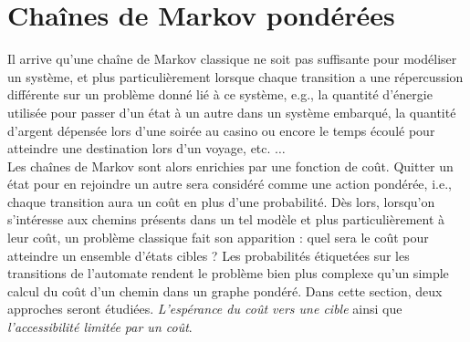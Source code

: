 \documentclass[12pt,a4paper]{report}
\theoremstyle{definition}%
\theoremstyle{remark}
\newtheorem{example}{Exemple}[chapter]
\newcommand{\eg}{e.g., }
\newcommand{\ie}{i.e., }
\let\labelitemi\labelitemii
\begin{document}
%

\section{Chaînes de Markov pondérées}
Il arrive qu'une chaîne de Markov classique ne soit pas suffisante pour modéliser un système, et plus particulièrement lorsque chaque transition a une répercussion différente sur un problème donné lié à ce système, \eg la quantité d'énergie utilisée pour passer d'un état à un autre dans un système embarqué, la quantité d'argent dépensée lors d'une soirée au casino ou encore le temps écoulé pour atteindre une destination lors d'un voyage, etc. $\dots$ \\
Les chaînes de Markov sont alors enrichies par une fonction de coût. Quitter un état pour en rejoindre un autre sera considéré comme une action pondérée, \ie chaque transition aura un coût en plus d'une probabilité. Dès lors, lorsqu'on s'intéresse aux chemins présents dans un tel modèle et plus particulièrement à leur coût, un problème classique fait son apparition : quel sera le coût pour atteindre un ensemble d'états cibles ? Les probabilités étiquetées sur les transitions de l'automate rendent le problème bien plus complexe qu'un simple calcul du coût d'un chemin dans un graphe pondéré. Dans cette section, deux approches seront étudiées. \textit{L'espérance du coût vers une cible} ainsi que \textit{l'accessibilité limitée par un coût}.
\end{document}
